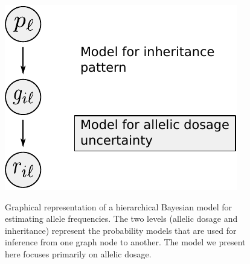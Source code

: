 \documentclass[11pt,english,letterpaper,oneside]{article}
\begin{document}
\begin{figure}
\centering
\caption{Graphical representation of a hierarchical Bayesian model for estimating allele frequencies. The two levels (allelic dosage and inheritance) represent the probability models that are used for inference from one graph node to another. The model we present here focuses primarily on allelic dosage.}
\vspace{0.25in}
\includegraphics{fig/figure1-model-graph}
\label{fig:model-graph}
\end{figure}
\end{document}
